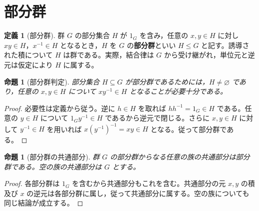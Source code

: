 \documentclass[a5paper,10pt,dvipdfmx]{jsarticle}
\theoremstyle{definition}
\newtheorem{defn}[ruledef]{定義}
\theoremstyle{plain}
\newtheorem{prop}[ruledef]{命題}
\begin{document}
\section{部分群}
\begin{defn}[部分群]\label{k228}
群 $G$ の部分集合 $H$ が $1_G$ を含み，任意の $x,y\in H$ に対し $xy\in H$，$x^{-1}\in H$ となるとき，$H$ を $G$ の\textbf{部分群}といい $H\leq G$ と記す。誘導された積について $H$ は群である。実際，結合律は $G$ から受け継がれ，単位元と逆元は仮定により $H$ に属する。
\end{defn}
\begin{prop}[部分群判定]\label{k229}
部分集合 $H\subseteq G$ が部分群であるためには，$H\ne\varnothing$ であり，任意の $x,y\in H$ について $xy^{-1}\in H$ となることが必要十分である。
\end{prop}
\begin{proof}
必要性は定義から従う。逆に $h\in H$ を取れば $hh^{-1}=1_G\in H$ である。任意の $y\in H$ について $1_Gy^{-1}\in H$ であるから逆元で閉じる。さらに $x,y\in H$ に対して $y^{-1}\in H$ を用いれば $x(y^{-1})^{-1}=xy\in H$ となる。従って部分群である。
\end{proof}
\begin{prop}[部分群の共通部分]\label{k230}
群 $G$ の部分群からなる任意の族の共通部分は部分群である。空の族の共通部分は $G$ とする。
\end{prop}
\begin{proof}
各部分群は $1_G$ を含むから共通部分もこれを含む。共通部分の元 $x,y$ の積及び $x$ の逆元は各部分群に属し，従って共通部分に属する。空の族についても同じ結論が成立する。
\end{proof}
\end{document}
